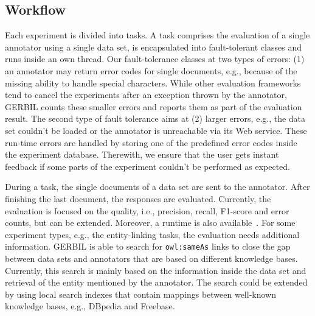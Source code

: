 \subsection{Workflow}
Each experiment is divided into tasks.
A task comprises the evaluation of a single annotator using a single data set, is encapsulated into fault-tolerant classes and runs inside an own thread.
Our fault-tolerance classes at two types of errors: (1) an annotator may return error codes for single documents, e.g., because of the missing ability to handle special characters.
While other evaluation frameworks tend to cancel the experiments after an exception thrown by the annotator, GERBIL counts these smaller errors and reports them as part of the evaluation result.
The second type of fault tolerance aims at (2) larger errors, e.g., the data set couldn't be loaded or the annotator is unreachable via its Web service.
These run-time errors are handled by storing one of the predefined error codes inside the experiment database.
Therewith, we ensure that the user gets instant feedback if some parts of the experiment couldn't be performed as expected.

During a task, the single documents of a data set are sent to the annotator.
After finishing the last document, the responses are evaluated.
Currently, the evaluation is focused on the quality, i.e., precision, recall, F1-score and error counts, but can be extended.
Moreover, a runtime is also available~\cite{GERBIL}.
For some experiment types, e.g., the entity-linking tasks, the evaluation needs additional information.
GERBIL is able to search for \texttt{owl:sameAs} links to close the gap between data sets and annotators that are based on different knowledge bases.
Currently, this search is mainly based on the information inside the data set and retrieval of the entity mentioned by the annotator.
The search could be extended by using local search indexes that contain mappings between well-known knowledge bases, e.g., DBpedia and Freebase.


